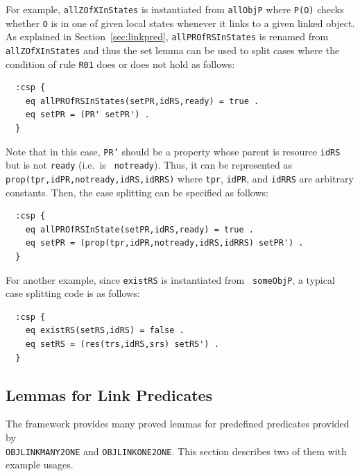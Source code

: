 \documentclass[12pt]{report}
\newcommand{\stt}[1]{{\small{\tt {#1}}}}
\begin{document}
For example, {\tt allZOfXInStates} is instantiated from {\tt allObjP}
where \stt{P(O)} checks whether {\tt O} is in one of given local
states whenever it links to a given linked object.  As explained in
Section~\ref{sec:linkpred}, {\tt allPROfRSInStates} is renamed
from {\tt allZOfXInStates} and thus the set lemma can be used to
split cases where the condition of rule {\tt R01} does or does not
hold as follows:
\begin{verbatim}
  :csp {
    eq allPROfRSInStates(setPR,idRS,ready) = true .
    eq setPR = (PR' setPR') .
  }
\end{verbatim}
Note that in this case, {\tt PR'} should be a property whose parent is
resource {\tt idRS} but is not {\tt ready} (i.e.\ is {\tt
  notready}). Thus, it can be represented as
\stt{prop(tpr,idPR,notready,idRS,idRRS)} where {\tt tpr}, {\tt idPR},
and {\tt idRRS} are arbitrary constants. Then, the case splitting
can be specified as follows:
\begin{verbatim}
  :csp {
    eq allPROfRSInState(setPR,idRS,ready) = true .
    eq setPR = (prop(tpr,idPR,notready,idRS,idRRS) setPR') .
  }
\end{verbatim}

For another example, since {\tt existRS} is instantiated from {\tt
  someObjP}, a typical case splitting code is as follows:
\begin{verbatim}
  :csp {
    eq existRS(setRS,idRS) = false .
    eq setRS = (res(trs,idRS,srs) setRS') .
  }
\end{verbatim}
\subsection{Lemmas for Link Predicates}
\label{sec:linklemma}
The framework provides many proved lemmas for predefined predicates
provided by\\ {\tt OBJLINKMANY2ONE} and {\tt OBJLINKONE2ONE}. This
section describes two of them with example usages.
\end{document}
